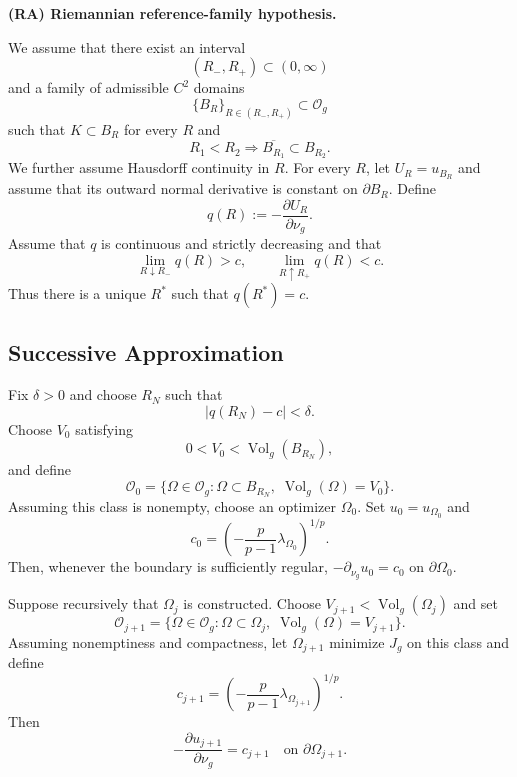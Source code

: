 \documentclass[11pt,a4paper]{article}
\theoremstyle{definition}
\theoremstyle{remark}
\newtheorem{remark}[theorem]{Remark}
\begin{document}
\medskip
\noindent
\textbf{(RA) Riemannian reference-family hypothesis.}

We assume that there exist an interval
\[
(R_-,R_+)\subset(0,\infty)
\]
and a family of admissible $C^2$ domains
\[
\{B_R\}_{R\in(R_-,R_+)}\subset\mathcal{O}_g
\]
such that $K\subset B_R$ for every $R$ and
\[
R_1<R_2\Longrightarrow\overline{B_{R_1}}\subset B_{R_2}.
\]
We further assume Hausdorff continuity in $R$. For every $R$, let
$U_R=u_{B_R}$ and assume that its outward normal derivative
is constant on $\partial B_R$. Define
\[
q(R):=-\frac{\partial U_R}{\partial\nu_g}.
\]
Assume that $q$ is continuous and strictly decreasing and that
\begin{equation}
\lim_{R\downarrow R_-}q(R)>c,\qquad
\lim_{R\uparrow R_+}q(R)<c.
\label{eq:reference-family-crossing}
\end{equation}
Thus there is a unique $R^\ast$ such that $q(R^\ast)=c$.

\subsection{Successive Approximation}

Fix $\delta>0$ and choose $R_N$ such that
\begin{equation}
|q(R_N)-c|<\delta.
\label{eq:initial-flux-approximation}
\end{equation}
Choose $V_0$ satisfying
\begin{equation}
0<V_0<\operatorname{Vol}_g(B_{R_N}),
\end{equation}
and define
\begin{equation}
\mathcal{O}_0=\{\Omega\in\mathcal{O}_g:\Omega\subset B_{R_N},\;\operatorname{Vol}_g(\Omega)=V_0\}.
\label{eq:O0}
\end{equation}
Assuming this class is nonempty, choose an optimizer $\Omega_0$.
Set $u_0=u_{\Omega_0}$ and
\[
c_0=\left(-\frac{p}{p-1}\lambda_{\Omega_0}\right)^{1/p}.
\]
Then, whenever the boundary is sufficiently regular,
$-\partial_{\nu_g}u_0=c_0$ on $\partial\Omega_0$.

Suppose recursively that $\Omega_j$ is constructed. Choose
$V_{j+1}<\operatorname{Vol}_g(\Omega_j)$ and set
\begin{equation}
\mathcal{O}_{j+1}=\{\Omega\in\mathcal{O}_g:\Omega\subset\Omega_j,\;\operatorname{Vol}_g(\Omega)=V_{j+1}\}.
\label{eq:recursive-admissible-class}
\end{equation}
Assuming nonemptiness and compactness, let $\Omega_{j+1}$ minimize $J_g$
on this class and define
\[
c_{j+1}=\left(-\frac{p}{p-1}\lambda_{\Omega_{j+1}}\right)^{1/p}.
\]
Then
\begin{equation}
-\frac{\partial u_{j+1}}{\partial\nu_g}=c_{j+1}\quad\text{on }\partial\Omega_{j+1}.
\label{eq:recursive-bernoulli}
\end{equation}
\end{document}
